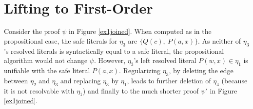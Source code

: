 
\section{Lifting to First-Order}\label{sec:Challenges}



\def\e{\mbox{\ $\vdash$\ }}


 
\begin{example}\label{ex:unif} 
Consider the proof $\psi$ in Figure \ref{ex1joined}. When computed as in the propositional case, the safe literals for $\eta_3$ are $\{ Q(c), ~ P(a,x)\}$.
As neither of $\eta_3$'s resolved literals is syntactically equal to a safe literal, the propositional {\RPI} algorithm would not change $\psi$. However, $\eta_3$'s left resolved literal $P(w,x)\in \eta_1$ is unifiable with the safe literal $P(a,x)$. Regularizing $\eta_3$, by deleting the edge between $\eta_2$ and $\eta_3$ and replacing $\eta_3$ by $\eta_1$, leads to further deletion of $\eta_4$ (because it is not resolvable with $\eta_1$) and finally to the much shorter proof $\psi'$ in Figure \ref{ex1joined}.



    


\end{example}
